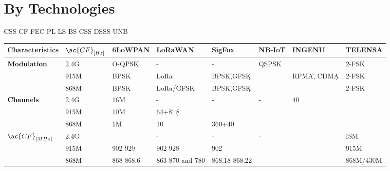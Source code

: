 \onecolumn
\section{By Technologies}
\setlength{\hoffset}{-.5in}

\ac{CSS} \ac{CF} \ac{FEC}  \ac{PL} \ac{LS} \ac{BS} \ac{CSS} \ac{DSSS} \ac{UNB}


\begin{longtable}{l|l|l|l|l|l|l|l}
	\bf{Characteristics}               & $\ac{CF}_{[Hz]}$ & \bf{6LoWPAN} & \bf{LoRaWAN}     & \bf{SigFox}   & \bf{NB-IoT} & \textbf{INGENU}    & \textbf{TELENSA}\\\hline
	\multirow{3}{*}{$\bf{Modulation}$} & 2.4G             & O-QPSK       & -                & -             & QSPSK       &                    & 2-FSK           \\
	\                                  & 915M             & BPSK         & LoRa             & BPSK\u,GFSK\d &             & RPMA\u,	CDMA\d     & 2-FSK           \\
	\                                  & 868M             & BPSK         & LoRa/GFSK        & BPSK\u,GFSK\d &             &                    & 2-FSK           \\\hline
	\multirow{3}{*}{$\bf{Channels}$}   & 2.4G             & 16M          & -                & -             & -           & 40                 & \ko             \\
	\                                  & 915M             & 10M          & 64+8\u, 8\d      & \ko           & \ko         & \ko                & \ko             \\
	\                                  & 868M             & 1M           & 10               & 360+40        & \ko         & \ko                & \ko             \\\hline
	\multirow{2}{*}{$\ac{CF}_{[MHz]}$} & 2.4G             & \ko          & -                & -             & -           & \ko                & ISM             \\
	\                                  & 915M             & 902-929      & 902-928          & 902           & \ko         & \ko                & 915M            \\
	\                                  & 868M             & 868-868.6    & 863-870 and 780  & 868.18-868.22 & \ko         & \ko                & 868M/430M       \\\hline

\end{longtable}
